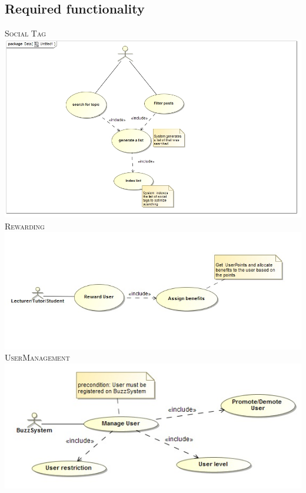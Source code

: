 \documentclass[a4paper,12pt]{report}
\begin{document}
\subsection{Required functionality}
\textsc{Social Tag}
\emph{}\\
\includegraphics[width=1\textwidth]{./socialtag.jpg}\\[0.4cm]

\textsc{Rewarding}
\emph{}\\
\includegraphics[width=1\textwidth]{./Use_Case_Diagram_RewardUser.jpg}\\[0.4cm] 

\newpage
\textsc{UserManagement}
\emph{}\\
\includegraphics[width=1\textwidth]{./Activity_Diagram_UserManagement.jpg}\\[0.4cm]
\end{document}
